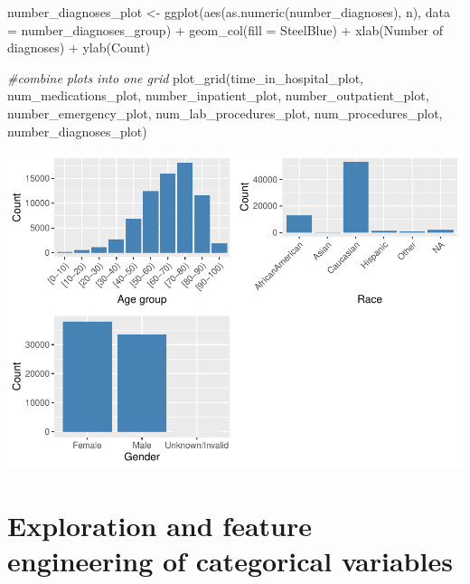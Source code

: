 \documentclass[
]{article}
\newenvironment{Shaded}{\begin{snugshade}}{\end{snugshade}}
\newcommand{\AttributeTok}[1]{\textcolor[rgb]{0.77,0.63,0.00}{#1}}
\newcommand{\CommentTok}[1]{\textcolor[rgb]{0.56,0.35,0.01}{\textit{#1}}}
\newcommand{\FunctionTok}[1]{\textcolor[rgb]{0.00,0.00,0.00}{#1}}
\newcommand{\NormalTok}[1]{#1}
\newcommand{\OtherTok}[1]{\textcolor[rgb]{0.56,0.35,0.01}{#1}}
\newcommand{\SpecialCharTok}[1]{\textcolor[rgb]{0.00,0.00,0.00}{#1}}
\newcommand{\StringTok}[1]{\textcolor[rgb]{0.31,0.60,0.02}{#1}}
\begin{document}
\begin{Shaded}
\begin{Highlighting}[]
\NormalTok{number\_diagnoses\_plot }\OtherTok{\textless{}{-}} 
  \FunctionTok{ggplot}\NormalTok{(}\FunctionTok{aes}\NormalTok{(}\FunctionTok{as.numeric}\NormalTok{(number\_diagnoses), n), }\AttributeTok{data =}\NormalTok{ number\_diagnoses\_group) }\SpecialCharTok{+}
  \FunctionTok{geom\_col}\NormalTok{(}\AttributeTok{fill =} \StringTok{\textquotesingle{}SteelBlue\textquotesingle{}}\NormalTok{) }\SpecialCharTok{+}
  \FunctionTok{xlab}\NormalTok{(}\StringTok{\textquotesingle{}Number of diagnoses\textquotesingle{}}\NormalTok{) }\SpecialCharTok{+}
  \FunctionTok{ylab}\NormalTok{(}\StringTok{\textquotesingle{}Count\textquotesingle{}}\NormalTok{)}

\CommentTok{\#combine plots into one grid}
\FunctionTok{plot\_grid}\NormalTok{(time\_in\_hospital\_plot,}
\NormalTok{          num\_medications\_plot,}
\NormalTok{          number\_inpatient\_plot,}
\NormalTok{          number\_outpatient\_plot,}
\NormalTok{          number\_emergency\_plot,}
\NormalTok{          num\_lab\_procedures\_plot,}
\NormalTok{          num\_procedures\_plot,}
\NormalTok{          number\_diagnoses\_plot)}
\end{Highlighting}
\end{Shaded}

\includegraphics{exploratory_analysis_files/figure-latex/unnamed-chunk-11-1.pdf}

\hypertarget{exploration-and-feature-engineering-of-categorical-variables}{%
\section{Exploration and feature engineering of categorical
variables}\label{exploration-and-feature-engineering-of-categorical-variables}}
\end{document}
